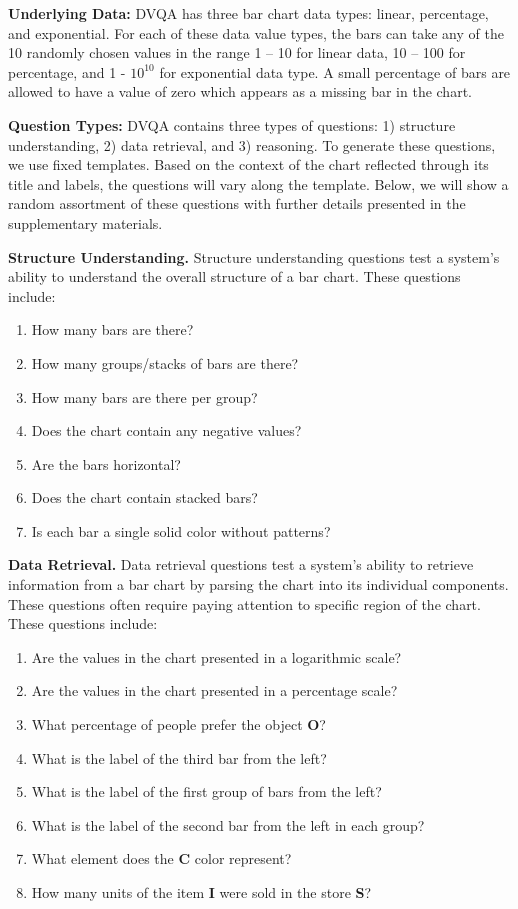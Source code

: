 \documentclass[10pt,twocolumn,letterpaper]{article}
\newcommand{\new}[1]{#1}
\begin{document}
\textbf{Underlying Data:}
\new{DVQA has three bar chart data types: linear, percentage, and exponential. For each of these data value types, the bars can take any of the 10 randomly chosen values in the range 1 -- 10 for linear data, 10 -- 100 for percentage, and 1 - $10^{10}$ for exponential data type. A small percentage of bars are allowed to have a value of zero which appears as a missing bar in the chart.}

\textbf{Question Types:}
DVQA contains three types of questions: 1) structure understanding, 2) data retrieval, and 3) reasoning. \new{To generate these questions, we use fixed templates. Based on the context of the chart reflected through its title and labels, the questions will vary along the template. Below, we will show a random assortment of these questions with further details presented in the supplementary materials.

\textbf{Structure Understanding.} Structure understanding  questions test a system's ability to understand the overall structure of a bar chart. These questions include: 
\begin{enumerate}[noitemsep, wide, labelwidth=!, labelindent=0pt]
\small
\item How many bars are there?
\item How many groups/stacks of bars are there?
\item How many bars are there per group?
\item Does the chart contain any negative values?
\item Are the bars horizontal?
\item Does the chart contain stacked bars?
\item Is each bar a single solid color without patterns?
\end{enumerate}


\textbf{Data Retrieval.} Data retrieval questions test a system's ability to retrieve information from a bar chart by parsing the chart into its individual components. These questions often require paying attention to specific region of the chart. These questions include:
\begin{enumerate}[noitemsep, wide, labelwidth=!, labelindent=0pt]
\small
\item Are the values in the chart presented in a logarithmic scale?
\item Are the values in the chart presented in a percentage scale?
\item What percentage of people prefer the object \textbf{O}?
\item What is the label of the third bar from the left?
\item What is the label of the first group of bars from the left?
\item What is the label of the second bar from the left in each group?
\item What element does the \textbf{C} color represent?
\item How many units of the item \textbf{I} were sold in the store \textbf{S}?
\end{enumerate}


}
\end{document}
